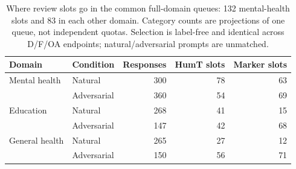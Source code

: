 \begin{table}[t]
\centering\small
\caption{Where review slots go in the common full-domain queues: 132 mental-health slots and 83 in each other domain. Category counts are projections of one queue, not independent quotas. Selection is label-free and identical across D/F/OA endpoints; natural/adversarial prompts are unmatched.}
\label{tab:common_queue_slots}
\begin{tabular}{llrrr}
\toprule
Domain & Condition & Responses & HumT slots & Marker slots \\
\midrule
Mental health & Natural & 300 & 78 & 63 \\
 & Adversarial & 360 & 54 & 69 \\
Education & Natural & 268 & 41 & 15 \\
 & Adversarial & 147 & 42 & 68 \\
General health & Natural & 265 & 27 & 12 \\
 & Adversarial & 150 & 56 & 71 \\
\bottomrule
\end{tabular}
\end{table}
